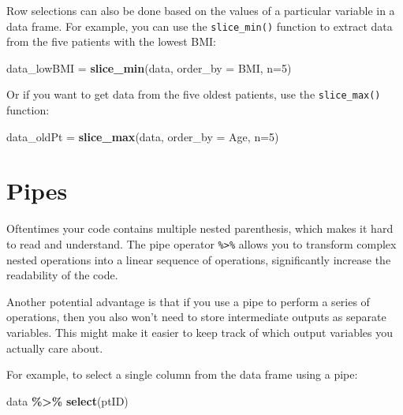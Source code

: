 \documentclass[
]{article}
\newenvironment{Shaded}{\begin{snugshade}}{\end{snugshade}}
\newcommand{\AttributeTok}[1]{\textcolor[rgb]{0.13,0.29,0.53}{#1}}
\newcommand{\DecValTok}[1]{\textcolor[rgb]{0.00,0.00,0.81}{#1}}
\newcommand{\FunctionTok}[1]{\textcolor[rgb]{0.13,0.29,0.53}{\textbf{#1}}}
\newcommand{\NormalTok}[1]{#1}
\newcommand{\OtherTok}[1]{\textcolor[rgb]{0.56,0.35,0.01}{#1}}
\newcommand{\SpecialCharTok}[1]{\textcolor[rgb]{0.81,0.36,0.00}{\textbf{#1}}}
\begin{document}
Row selections can also be done based on the values of a particular
variable in a data frame. For example, you can use the
\texttt{slice\_min()} function to extract data from the five patients
with the lowest BMI:

\begin{Shaded}
\begin{Highlighting}[]
\NormalTok{data\_lowBMI }\OtherTok{=} \FunctionTok{slice\_min}\NormalTok{(data, }\AttributeTok{order\_by =}\NormalTok{ BMI, }\AttributeTok{n=}\DecValTok{5}\NormalTok{)}
\end{Highlighting}
\end{Shaded}

Or if you want to get data from the five oldest patients, use the
\texttt{slice\_max()} function:

\begin{Shaded}
\begin{Highlighting}[]
\NormalTok{data\_oldPt }\OtherTok{=} \FunctionTok{slice\_max}\NormalTok{(data, }\AttributeTok{order\_by =}\NormalTok{ Age, }\AttributeTok{n=}\DecValTok{5}\NormalTok{)}
\end{Highlighting}
\end{Shaded}

\section{Pipes}\label{pipes}

Oftentimes your code contains multiple nested parenthesis, which makes
it hard to read and understand. The pipe operator
\texttt{\%\textgreater{}\%} allows you to transform complex nested
operations into a linear sequence of operations, significantly increase
the readability of the code.

Another potential advantage is that if you use a pipe to perform a
series of operations, then you also won't need to store intermediate
outputs as separate variables. This might make it easier to keep track
of which output variables you actually care about.

For example, to select a single column from the data frame using a pipe:

\begin{Shaded}
\begin{Highlighting}[]
\NormalTok{data }\SpecialCharTok{\%\textgreater{}\%}
  \FunctionTok{select}\NormalTok{(ptID)}
\end{Highlighting}
\end{Shaded}
\end{document}
